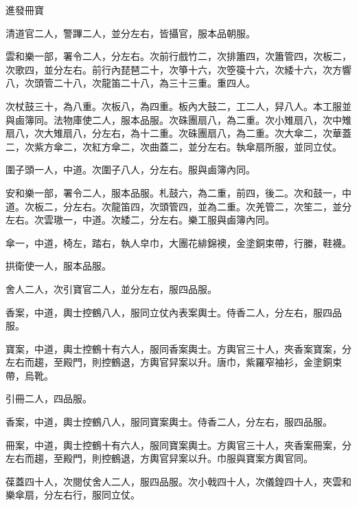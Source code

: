 \begin{pinyinscope}
 進發冊寶



 清道官二人，警蹕二人，並分左右，皆攝官，服本品朝服。



 雲和樂一部，署令二人，分左右。次前行戲竹二，次排簫四，次簫管四，次板二，次歌四，並分左右。前行內琵琶二十，次箏十六，次箜篌十六，次緌十六，次方響八，次頭管二十八，次龍笛二十八，為三十三重。重四人。



 次杖鼓三十，為八重。次板八，為四重。板內大鼓二，工二人，舁八人。本工服並與鹵簿同。法物庫使二人，服本品服。次硃團扇八，為二重。次小雉扇八，次中雉扇八，次大雉扇八，分左右，為十二重。次硃團扇八，為二重。次大傘二，次華蓋二，次紫方傘二，次紅方傘二，次曲蓋二，並分左右。執傘扇所服，並同立仗。



 圍子頭一人，中道。次圍子八人，分左右。服與鹵簿內同。



 安和樂一部，署令二人，服本品服。札鼓六，為二重，前四，後二。次和鼓一，中道。次板二，分左右。次龍笛四，次頭管四，並為二重。次羌管二，次笙二，並分左右。次雲璈一，中道。次緌二，分左右。樂工服與鹵簿內同。



 傘一，中道，椅左，踏右，執人皁巾，大團花緋錦襖，金塗銅束帶，行縢，鞋襪。



 拱衛使一人，服本品服。



 舍人二人，次引寶官二人，並分左右，服四品服。



 香案，中道，輿士控鶴八人，服同立仗內表案輿士。侍香二人，分左右，服四品服。



 寶案，中道，輿士控鶴十有六人，服同香案輿士。方輿官三十人，夾香案寶案，分左右而趨，至殿門，則控鶴退，方輿官舁案以升。唐巾，紫羅窄袖衫，金塗銅束帶，烏靴。



 引冊二人，四品服。



 香案，中道，輿士控鶴八人，服同寶案輿士。侍香二人，分左右，服四品服。



 冊案，中道，輿士控鶴十有六人，服同寶案輿士。方輿官三十人，夾香案冊案，分左右而趨，至殿門，則控鶴退，方輿官舁案以升。巾服與寶案方輿官同。



 葆蓋四十人，次閱仗舍人二人，服四品服。次小戟四十人，次儀鍠四十人，夾雲和樂傘扇，分左右行，服同立仗。




\end{pinyinscope}
